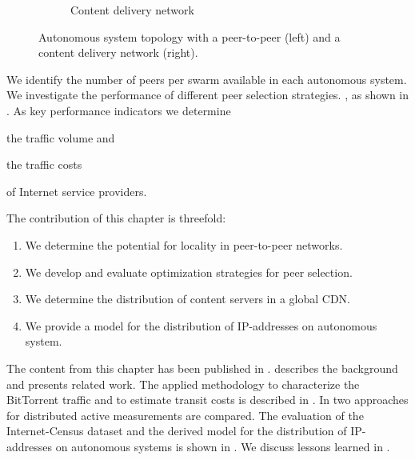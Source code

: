 \begin{figure}[bt]
\begin{subfigure}[b]{0.54\textwidth}
    \vspace{-0.5cm}
    \caption{Content delivery network}
    \label{fig:aslevel:cdn}
	\end{subfigure}
\hspace{-0.5cm}
	\caption{Autonomous system topology with a peer-to-peer (left) and a content delivery network (right).}
\end{figure}

We identify the number of peers per swarm available in each autonomous system. We investigate the performance of different peer selection strategies. , as shown in .
As key performance indicators we determine
\begin{enumerate*}
\item the traffic volume and
\item the traffic costs
\end{enumerate*}
of Internet service providers.

The contribution of this chapter is threefold:
\begin{enumerate}
\item We determine the potential for locality in peer-to-peer networks.
\item We develop and evaluate optimization strategies for peer selection.
\item We determine the distribution of content servers in a global CDN.
\item We provide a model for the distribution of IP-addresses on autonomous system.
\end{enumerate}

The content from this chapter has been published in \cite{burger2012profit,burger2014vantage,burger2016hierarchical}.
 describes the background and presents related work.
 The applied methodology to characterize the BitTorrent traffic and to estimate transit costs is described in .
In  two approaches for distributed active measurements are compared.
The evaluation of the Internet-Census dataset and the derived model for the distribution of IP-addresses on autonomous systems is shown in .
We discuss lessons learned in .






